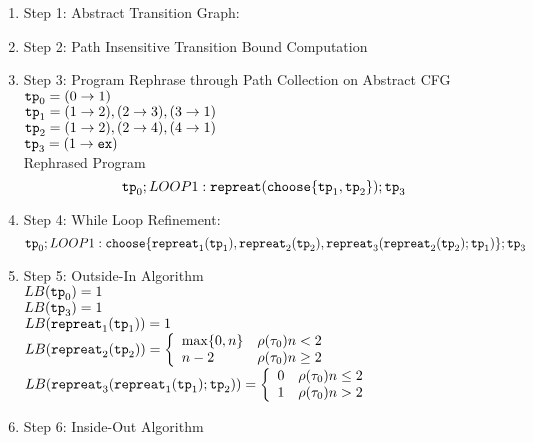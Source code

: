     \begin{enumerate}
      \item Step 1: Abstract Transition Graph:
    
    \item Step 2: Path Insensitive Transition Bound Computation
    
    \item Step 3: Program Rephrase through Path Collection on Abstract CFG
    \\
    $\mathtt{tp}_0 = (0 \to 1)$
    \\
    $\mathtt{tp}_1 = (1 \to 2), (2 \to 3), (3 \to 1)$
    \\
    $\mathtt{tp}_2 = (1 \to 2), (2 \to 4), (4 \to 1)$
    \\
    $\mathtt{tp}_3 = (1 \to \mathtt{ex})$
    \\
    Rephrased Program
    \[
    \mathtt{tp}_0 ; LOOP1: \mathtt{repreat}(\mathtt{choose}\{\mathtt{tp}_1, \mathtt{tp}_2 \}); \mathtt{tp}_3
    \]
    \item Step 4: While Loop Refinement:
    \[
      \mathtt{tp}_0 ; 
      LOOP1: \mathtt{choose}\{\mathtt{repreat}_1(\mathtt{tp}_1), \mathtt{repreat}_2(\mathtt{tp}_2),
      \mathtt{repreat}_3(\mathtt{repreat}_2(\mathtt{tp}_2); \mathtt{tp}_1)\}; \mathtt{tp}_3
      \]
    \item Step 5: Outside-In Algorithm
    \\
    $LB(\mathtt{tp}_0) = 1$
    \\
    $LB(\mathtt{tp}_3) = 1$
    \\
    $LB(\mathtt{repreat}_1(\mathtt{tp}_1)) = 1 $
    \\
    $LB(\rprepeat_2(\tpath_2)) = 
    \left\{
      \begin{array}{ll}
      \max\{0, n\} & \env(\trace_0) n < 2 \\
      n - 2 & \env(\trace_0)  n \geq 2
      \end{array} 
    \right.$
    \\
    $LB(\rprepeat_3(\rprepeat_1(\tpath_1); \tpath_2)) = 
    \left\{
      \begin{array}{ll}
      0 & \env(\trace_0) n \leq 2 \\
      1 & \env(\trace_0)  n > 2
      \end{array} 
    \right.$
    \\
    \item Step 6: Inside-Out Algorithm
    \begin{itemize}

\end{itemize}
\end{enumerate}
